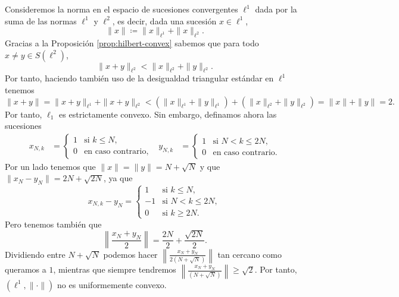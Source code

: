 \begin{example}
    Consideremos la norma en el espacio de sucesiones convergentes $ \ell^1 $ dada por la suma de las normas $ \ell^1 $ y $ \ell^2 $, es decir, dada una sucesión $ x \in \ell^1 $,
    \begin{equation}
        \| x \| \coloneq \| x \|_{\ell^1} + \| x \|_{\ell^2}.
    \end{equation}
    Gracias a la Proposición \ref{prop:hilbert-convex} sabemos que para todo $ x \neq y \in S(\ell^2) $,
    \begin{equation}
        \|x+y\|_{\ell^2} < \|x\|_{\ell^2} + \|y\|_{\ell^2}.
    \end{equation}
    Por tanto, haciendo también uso de la desigualdad triangular estándar en $ \ell^1 $ tenemos
    \begin{equation}
        \|x+y\| = \|x+y\|_{\ell^1} + \|x+y\|_{\ell^2} < \left( \|x\|_{\ell^1} + \|y\|_{\ell^1} \right) + \left( \|x\|_{\ell^2} + \|y\|_{\ell^2} \right) = \|x\| + \|y\| = 2.
    \end{equation}
    Por tanto, $ \ell_1 $ es estrictamente convexo. Sin embargo, definamos ahora las sucesiones
    \begin{align}
        x_{N, k} &=
        \begin{cases}
            1 & \text{si } k \leq N, \\
            0 & \text{en caso contrario},
        \end{cases}
        &
        y_{N, k} &=
        \begin{cases}
            1 & \text{si } N < k \leq 2N, \\
            0 & \text{en caso contrario}.
        \end{cases}
    \end{align}
    Por un lado tenemos que $ \|x\| = \|y\| = N + \sqrt{N} $ y que $ \|x_N - y_N\| = 2N + \sqrt{2N} $, ya que
    \begin{equation}
        x_{N, k} - y_N =
        \begin{cases}
            1 & \text{si } k \leq N, \\
            -1 & \text{si } N < k \leq 2N, \\
            0 & \text{si } k \geq 2N.
        \end{cases}
    \end{equation}
    Pero tenemos también que
    \begin{equation}
        \left\| \frac{x_N+y_N}{2} \right\| = \frac{2N}{2} + \frac{\sqrt{2N}}{2}.
    \end{equation}
    Dividiendo entre $ N + \sqrt{N} $ podemos hacer $ \left\| \frac{x_N+y_N}{2 (N + \sqrt{N})} \right\| $ tan cercano como queramos a $ 1 $, mientras que siempre tendremos $ \left\| \frac{x_N+y_N}{(N + \sqrt{N})} \right\| \geq \sqrt{2}$. Por tanto, $ (\ell^1, \| \cdot \|) $ no es uniformemente convexo.
\end{example}